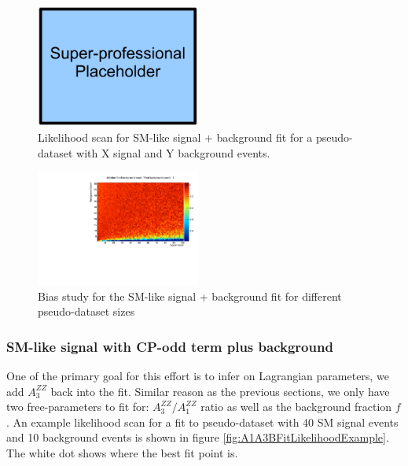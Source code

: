 \documentclass{cmspaper}
\begin{document}
\begin{figure}[htb!]
  \begin{center}
    \includegraphics[width=0.48\textwidth]{figures/PlaceHolder.pdf}
    \caption{Likelihood scan for SM-like signal + background fit for a pseudo-dataset
    with X signal and Y background events.}
    \label{fig:A1BFitLikelihoodScan}
  \end{center}
\end{figure}

\begin{figure}[htb!]
  \begin{center}
    \includegraphics[width=0.48\textwidth]{figures/A1BFit_BackgroundBias.pdf}
    \caption{Bias study for the SM-like signal + background fit for different pseudo-dataset
    sizes}
    \label{fig:A1BFitFractionBias}
  \end{center}
\end{figure}


\subsubsection{SM-like signal with CP-odd term plus background}

One of the primary goal for this effort is to infer on Lagrangian parameters, we add $A_3^{ZZ}$ back
into the fit.  Similar reason as the previous sections, we only have two free-parameters to fit for:
$A_3^{ZZ} / A_1^{ZZ}$ ratio as well as the background fraction $f$.  An example likelihood scan for
a fit to pseudo-dataset with 40 SM signal events and 10 background events is shown in figure
\ref{fig:A1A3BFitLikelihoodExample}.  The white dot shows where the best fit point is.
\end{document}
